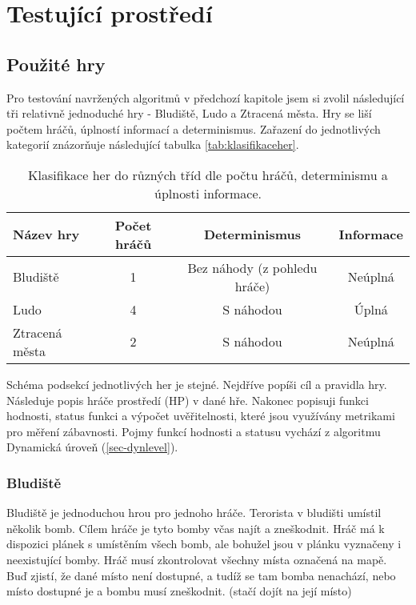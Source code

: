 \chapter{Testující prostředí}



\section{Použité hry}

Pro testování navržených algoritmů v předchozí kapitole jsem si zvolil následující tři relativně jednoduché hry - Bludiště, Ludo a Ztracená města. Hry se liší počtem hráčů, úplností informací a determinismus. Zařazení do jednotlivých kategorií znázorňuje následující tabulka \ref{tab:klasifikaceher}.

\begin{table*}[b]\footnotesize
\vspace*{0mm}
\caption{{\label{tab:klasifikaceher}} Klasifikace her do různých tříd dle počtu hráčů, determinismu a úplnosti informace. }
\vspace*{0mm}
\label{shadowtable}
\begin{center}
\begin{tabular}{| l || c | c | c |}
\hline
Název hry & Počet hráčů & Determinismus & Informace \\
\hline
\hline
Bludiště & 1 & Bez náhody (z pohledu hráče) & Neúplná \\ \hline
Ludo & 4 & S náhodou & Úplná \\ \hline
Ztracená města & 2 & S náhodou & Neúplná \\ \hline
\end{tabular}
\end{center}
\end{table*}

Schéma podsekcí jednotlivých her je stejné. Nejdříve popíši cíl a pravidla hry. Následuje popis hráče prostředí (HP) v dané hře. Nakonec popisuji funkci hodnosti, status funkci a výpočet uvěřitelnosti, které jsou využívány metrikami pro měření zábavnosti. Pojmy funkcí hodnosti a statusu vychází z algoritmu Dynamická úroveň (\ref{sec-dynlevel}).

\subsection{Bludiště}

Bludiště je jednoduchou hrou pro jednoho hráče. Terorista v bludišti umístil několik bomb. Cílem hráče je tyto bomby včas najít a zneškodnit. Hráč má k dispozici plánek s umístěním všech bomb, ale bohužel jsou v plánku vyznačeny i neexistující bomby. Hráč musí zkontrolovat všechny místa označená na mapě. Buď zjistí, že dané místo není dostupné, a tudíž se tam bomba nenachází, nebo místo dostupné je a bombu musí zneškodnit. (stačí dojít na její místo) 

